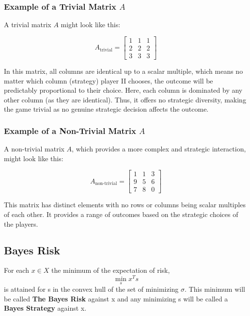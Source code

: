 \documentclass[11pt]{article}
\theoremstyle{boldStyle}
\begin{document}
\subsubsection{Example of a Trivial Matrix \( A \)}

A trivial matrix \( A \) might look like this:

\begin{equation*} \label{eq:trivial}
    A_{\text{trivial}} = \begin{bmatrix}
    1 & 1 & 1 \\
    2 & 2 & 2 \\
    3 & 3 & 3
    \end{bmatrix}
\end{equation*}

In this matrix, all columns are identical up to a scalar multiple, which means no matter which column (strategy) player II chooses, the outcome will be predictably proportional to their choice. Here, each column is dominated by any other column (as they are identical). Thus, it offers no strategic diversity, making the game trivial as no genuine strategic decision affects the outcome.

\subsubsection{Example of a Non-Trivial Matrix \( A \)}

A non-trivial matrix \( A \), which provides a more complex and strategic interaction, might look like this:

\begin{equation*} \label{eq:nontrivial}
    A_{\text{non-trivial}} = \begin{bmatrix}
    1 & 1 & 3 \\
    9 & 5 & 6 \\
    7 & 8 & 0
    \end{bmatrix}
\end{equation*}

This matrix has distinct elements with no rows or columns being scalar multiples of each other. It provides a range of outcomes based on the strategic choices of the players. 



\subsection{Bayes Risk}

For each $x \in X$ the minimum of the expectation of risk, 
\[
    \min_{s} x^T s
\]
is attained for s in the convex hull of the set of minimizing $\sigma$. 
This minimum will be called \textbf{The Bayes Risk} against x and any minimizing s will be called a \textbf{Bayes Strategy} against x.
\end{document}
